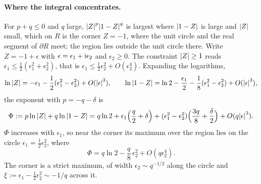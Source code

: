 \paragraph{Where the integral concentrates.}
For $p + q \le 0$ and $q$ large, ${|Z|}^p {|1 - Z|}^q$ is largest where ${|1 - Z|}$ is large and ${|Z|}$ small, which on $R$ is the corner $Z = - 1$, where the unit circle and the real segment of $\partial R$ meet; the region lies outside the unit circle there.
Write $Z = - 1 + \epsilon$ with $\epsilon = \epsilon_1 + \mathrm{i} \epsilon_2$ and $\epsilon_2 \ge 0$.
The constraint ${|Z|} \ge 1$ reads $\epsilon_1 \le \frac{1}{2} (\epsilon_1^2 + \epsilon_2^2)$, that is $\epsilon_1 \le \frac{1}{2} \epsilon_2^2 + O(\epsilon_2^4)$.
Expanding the logarithms,
\begin{equation}
  \ln {|Z|}
    = - \epsilon_1 - \frac{1}{2} (\epsilon_1^2 - \epsilon_2^2) + O({|\epsilon|}^3),
  \qquad
  \ln {|1 - Z|}
    = \ln 2 - \frac{\epsilon_1}{2} - \frac{1}{8} (\epsilon_1^2 - \epsilon_2^2) + O({|\epsilon|}^3),
\end{equation}
the exponent with $p = - q - \delta$ is
\begin{equation}
  \Phi
    := p \ln {|Z|} + q \ln {|1 - Z|}
    = q \ln 2
      + \epsilon_1 \Big( \frac{q}{2} + \delta \Big)
      + (\epsilon_1^2 - \epsilon_2^2) \Big( \frac{3 q}{8} + \frac{\delta}{2} \Big)
      + O(q {|\epsilon|}^3).
\end{equation}
$\Phi$ increases with $\epsilon_1$, so near the corner its maximum over the region lies on the circle $\epsilon_1 = \frac{1}{2} \epsilon_2^2$, where
\begin{equation}
  \Phi
    = q \ln 2 - \frac{q}{8} \, \epsilon_2^2 + O(q \epsilon_2^4).
\end{equation}
The corner is a strict maximum, of width $\epsilon_2 \sim q^{-1/2}$ along the circle and $\xi := \epsilon_1 - \frac{1}{2} \epsilon_2^2 \sim - 1 / q$ across it.

